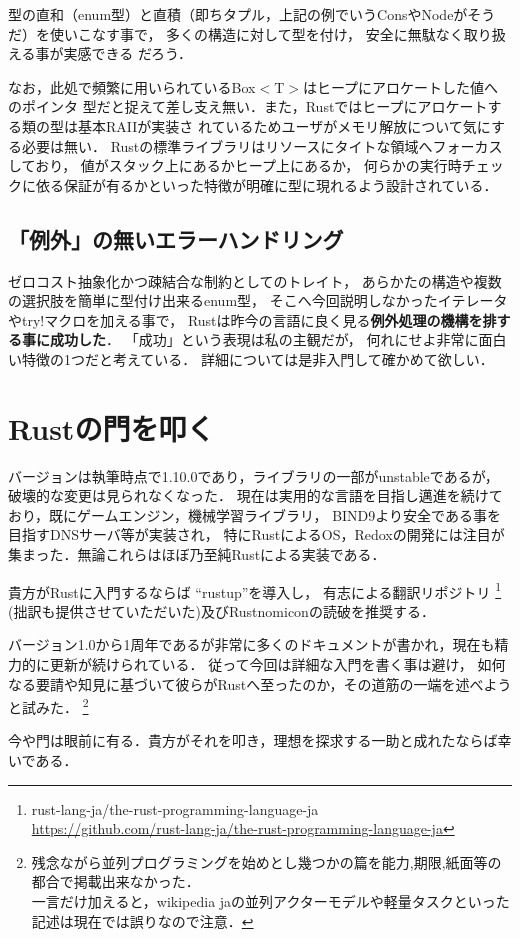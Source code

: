 型の直和（enum型）と直積（即ちタプル，上記の例でいうConsやNodeがそうだ）を使いこなす事で，
多くの構造に対して型を付け，
安全に無駄なく取り扱える事が実感できる
だろう．

なお，此処で頻繁に用いられているBox$<$T$>$はヒープにアロケートした値へのポインタ
型だと捉えて差し支え無い．また，Rustではヒープにアロケートする類の型は基本RAIIが実装さ
れているためユーザがメモリ解放について気にする必要は無い．
Rustの標準ライブラリはリソースにタイトな領域へフォーカスしており，
値がスタック上にあるかヒープ上にあるか，
何らかの実行時チェックに依る保証が有るかといった特徴が明確に型に現れるよう設計されている．

\subsection{「例外」の無いエラーハンドリング}
ゼロコスト抽象化かつ疎結合な制約としてのトレイト，
あらかたの構造や複数の選択肢を簡単に型付け出来るenum型，
そこへ今回説明しなかったイテレータやtry!マクロを加える事で，
Rustは昨今の言語に良く見る\textbf{例外処理の機構を排する事に成功した}．
「成功」という表現は私の主観だが，
何れにせよ非常に面白い特徴の1つだと考えている．
詳細については是非入門して確かめて欲しい．

\section{Rustの門を叩く}
バージョンは執筆時点で1.10.0であり，ライブラリの一部がunstableであるが，破壊的な変更は見られなくなった．
現在は実用的な言語を目指し邁進を続けており，既にゲームエンジン，機械学習ライブラリ，
BIND9より安全である事を目指すDNSサーバ等が実装され，
特にRustによるOS，Redoxの開発には注目が集まった．無論これらはほぼ乃至純Rustによる実装である．

貴方がRustに入門するならば ``rustup''を導入し，
有志による翻訳リポジトリ
\footnote{rust-lang-ja/the-rust-programming-language-ja \\
  \url{https://github.com/rust-lang-ja/the-rust-programming-language-ja}}
(拙訳も提供させていただいた)及びRustnomiconの読破を推奨する．

バージョン1.0から1周年であるが非常に多くのドキュメントが書かれ，現在も精力的に更新が続けられている．
従って今回は詳細な入門を書く事は避け，
如何なる要請や知見に基づいて彼らがRustへ至ったのか，その道筋の一端を述べようと試みた．
\footnote{残念ながら並列プログラミングを始めとし幾つかの篇を能力,期限,紙面等の都合で掲載出来なかった．
  \\ 一言だけ加えると，wikipedia jaの並列アクターモデルや軽量タスクといった記述は現在では誤りなので注意．}

今や門は眼前に有る．貴方がそれを叩き，理想を探求する一助と成れたならば幸いである．
